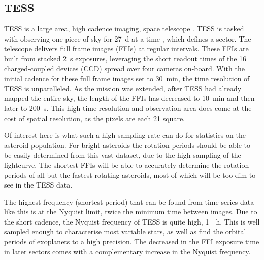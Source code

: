 \documentclass{UCreport}
\begin{document}
\subsection{TESS}\label{SubSec:TESS}

TESS is a large area, high cadence imaging, space telescope  \citep{Ricker2014}.
TESS is tasked with observing one piece of sky for \qty{27}{\day} at a time , which defines a sector.
The telescope delivers  full frame images (FFIs) at regular intervals.
These FFIs are built from stacked \qty{2}{\second} exposures, leveraging the short readout times of the 16 charged-coupled devices (CCD) spread over four cameras on-board.
With the initial cadence for these full frame images set to \qty{30}{\minute}, the time resolution of TESS is unparalleled.
As the mission was extended, after TESS had already mapped the entire sky, the length of the FFIs has decreased to \qty{10}{\minute} and then later to \qty{200}{\second}.
This high time resolution and observation area does come at the cost of spatial resolution, as the pixels are each \qty{21}{\arcsec} square.

Of interest here is what such a high sampling rate can do for statistics on the asteroid population.
For bright asteroids the rotation periods should be able to be easily determined from this vast dataset, due to the high sampling of the lightcurve.
The shortest FFIs will be able to accurately determine the rotation periods of all but the fastest rotating asteroids, most of which will be too dim to see in the TESS data.

The highest frequency (shortest period) that can be found from time series data like this is at the Nyquist limit, twice the minimum time between images.
Due to the short cadence, the Nyquist frequency of TESS is quite high, \qty{1}{\per\hour}.
This is well sampled enough to characterise most variable stars, as well as find the orbital periods of exoplanets to a high precision.
The decreased in the FFI exposure time in later sectors comes with a complementary increase in the Nyquist frequency.
\end{document}
